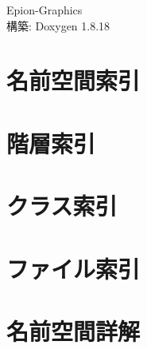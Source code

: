 \let\mypdfximage\pdfximage\def\pdfximage{\immediate\mypdfximage}\documentclass[twoside]{book}
\newcommand{\+}{\discretionary{\mbox{\scriptsize$\hookleftarrow$}}{}{}}
\newcommand{\clearemptydoublepage}{%
  \newpage{\pagestyle{empty}\cleardoublepage}%
}
\begin{document}
\begin{CJK}{UTF8}{min}

\hypersetup{pageanchor=false,
             bookmarksnumbered=true,
             pdfencoding=unicode
            }
\begin{titlepage}
\vspace*{7cm}
\begin{center}%
{\Large Epion-\/\+Graphics }\\
\vspace*{1cm}
{\large 構築\+: Doxygen 1.8.18}\\
\end{center}
\end{titlepage}
\clearemptydoublepage
{}
\tableofcontents
\clearemptydoublepage
{}
\hypersetup{pageanchor=true}

\chapter{名前空間索引}

\chapter{階層索引}

\chapter{クラス索引}

\chapter{ファイル索引}

\chapter{名前空間詳解}











\end{CJK}
\end{document}
